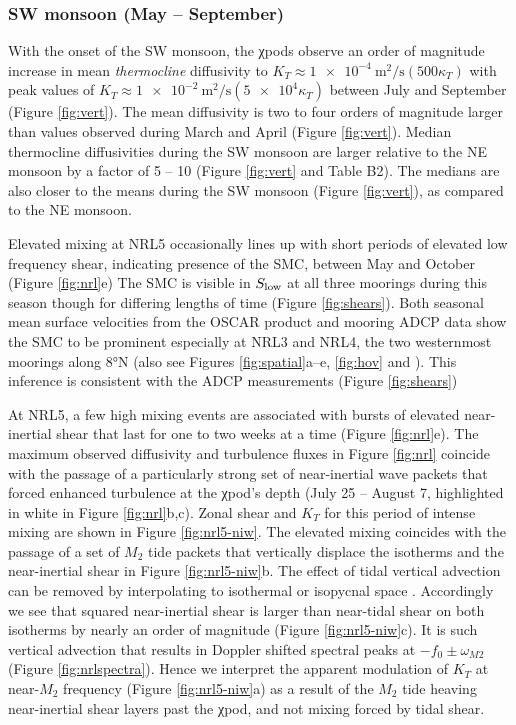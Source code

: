 \documentclass[twocol]{ametsoc}
\begin{document}
\subsubsection*{SW monsoon (May -- September)}
\label{sec:orgec06087}

With the onset of the SW monsoon, the χpods observe an order of magnitude increase in mean \emph{thermocline} diffusivity to \(K_T \approx \SI{1e-4}{\m\squared\per\s} (500κ_T)\) with peak values of \(K_T \approx \SI{1e-2}{\m\squared\per\s} (\num{5e4}κ_T)\) between July and September (Figure \ref{fig:vert}).
The mean diffusivity is two to four orders of magnitude larger than values observed during March and April (Figure \ref{fig:vert}).
Median thermocline diffusivities during the SW monsoon are larger relative to the NE monsoon by a factor of 5 -- 10 (Figure \ref{fig:vert} and Table B2).
The medians are also closer to the means during the SW monsoon (Figure \ref{fig:vert}), as compared to the NE monsoon.

Elevated mixing at NRL5 occasionally lines up with short periods of elevated low frequency shear, indicating presence of the SMC, between May and October (Figure \ref{fig:nrl}e)
The SMC is visible in \(S_\text{low}\) at all three moorings during this season though for differing lengths of time (Figure \ref{fig:shears}).
Both seasonal mean surface velocities from the OSCAR product and mooring ADCP data show the SMC to be prominent especially at NRL3 and NRL4, the two westernmost moorings along 8°N (also see Figures \ref{fig:spatial}a--e, \ref{fig:hov} and \citealp{Wijesekera2016a}).
This inference is consistent with the ADCP measurements (Figure \ref{fig:shears})

At NRL5, a few high mixing events are associated with bursts of elevated near-inertial shear that last for one to two weeks at a time  (Figure \ref{fig:nrl}e).
The maximum observed diffusivity and turbulence fluxes in Figure \ref{fig:nrl} coincide with the passage of a particularly strong set of near-inertial wave packets that forced enhanced turbulence at the χpod's depth (July 25 -- August 7, highlighted in white in Figure \ref{fig:nrl}b,c).
Zonal shear and \(K_T\) for this period of intense mixing are shown in Figure \ref{fig:nrl5-niw}.
The elevated mixing coincides with the passage of a set of \(M_2\) tide packets that vertically displace the isotherms and the near-inertial shear in Figure \ref{fig:nrl5-niw}b.
The effect of tidal vertical advection can be removed by interpolating to isothermal or isopycnal space \citep{Alford2001a}.
Accordingly we see that squared near-inertial shear is larger than near-tidal shear on both isotherms by nearly an order of magnitude (Figure \ref{fig:nrl5-niw}c).
It is such vertical advection that results in Doppler shifted spectral peaks at \(-f_0 \pm ω_{M2}\) (Figure \ref{fig:nrlspectra}).
Hence we interpret the apparent modulation of \(K_T\) at near-\(M_2\) frequency (Figure \ref{fig:nrl5-niw}a) as a result of the \(M_2\) tide heaving near-inertial shear layers past the χpod, and not mixing forced by tidal shear.
\end{document}
